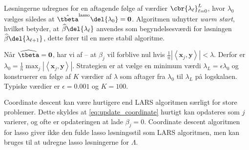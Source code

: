 %
Løsningerne udregnes for en aftagende følge af værdier \(\cbr{\lambda_{\ell}}_{\ell = 0}^L\), hvor \(\lambda_0\) vælges således at \(\hat{\tbeta}^\text{lasso} \del{\lambda_0} =\mathbf{0}\). 
Algoritmen udnytter \textit{warm start}, hvilket betyder, at \(\widehat{\beta} \del{\lambda_\ell}\) anvendes som begyndelsesværdi for løsningen \(\widehat{\beta} \del{\lambda_{\ell + 1}}\), dette fører til en mere stabil algoritme. 

Når \(\widehat{\tbeta} = \mathbf{0}\), har vi af -- at \(\hat{\beta}_j\) vil forblive nul hvis \(\frac{1}{n} \left\vert \left\langle \mathbf{x}_j, \mathbf{y} \right\rangle \right\vert < \lambda\). Derfor er \( \lambda_0 = \frac{1}{n} \max_j \left\vert \left\langle \mathbf{x}_j, \mathbf{y} \right\rangle \right\vert\).
Strategien er at vælge en minimum værdi \(\lambda_L = \epsilon \lambda_0\) og konstruerer en følge af \(K\) værdier af \(\lambda\) som aftager fra \(\lambda_0\) til \(\lambda_L\) på logskalaen.
Typiske værdier er \(\epsilon = 0.001\) og \(K =100\).
%
%

Coordinate descent kan være hurtigere end LARS algoritmen særligt for store problemer.
Dette skyldes at \eqref{eq:update_coordinate} hurtigt kan opdateres som \(j\) varierer, og ofte er opdateringen at lade \(\beta_j = 0\).
Coordinate descent algoritmen for lasso giver ikke den fulde lasso løsningsstil som LARS algoritmen, men kan bruges til at udregne lasso løsningerne for \(\Lambda\).

